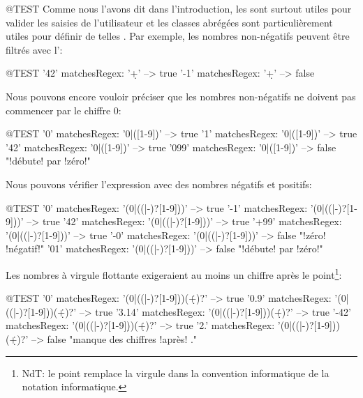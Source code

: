 \documentclass[a4paper,10pt,twoside]{book}
\begin{document}
\begin{code}{@TEST}
Comme nous l'avons dit dans l'introduction, les \expregs sont surtout
utiles pour valider les saisies de l'utilisateur et les classes
abrégées sont particulièrement utiles pour définir de telles \expregs.
Par exemple, les nombres non-négatifs peuvent être filtrés avec
l'\expreg \ct{\d+}:

\begin{code}{@TEST}
'42' matchesRegex: '\d+' --> true
'-1' matchesRegex: '\d+' --> false
\end{code}

Nous pouvons encore vouloir préciser que les nombres non-négatifs ne
doivent pas commencer par le chiffre 0:

\begin{code}{@TEST}
'0' matchesRegex: '0|([1-9]\d*)'     --> true
'1' matchesRegex: '0|([1-9]\d*)'     --> true
'42' matchesRegex: '0|([1-9]\d*)'   --> true
'099' matchesRegex: '0|([1-9]\d*)' --> false    "!débute! par !zéro!"
\end{code}

\noindent{} Nous pouvons vérifier l'expression avec des nombres négatifs et positifs:

\begin{code}{@TEST}
'0' matchesRegex: '(0|((\+|-)?[1-9]\d*))'     --> true
'-1' matchesRegex: '(0|((\+|-)?[1-9]\d*))'   --> true
'42' matchesRegex: '(0|((\+|-)?[1-9]\d*))'   --> true
'+99' matchesRegex: '(0|((\+|-)?[1-9]\d*))' --> true
'-0' matchesRegex: '(0|((\+|-)?[1-9]\d*))'   --> false    "!zéro! !négatif!"
'01' matchesRegex: '(0|((\+|-)?[1-9]\d*))'   --> false    "!débute! par !zéro!"
\end{code}

Les nombres à virgule flottante exigeraient au moins un chiffre après
le point\footnote{NdT: le point remplace la virgule dans la convention
  informatique de la notation informatique.}: 

\begin{code}{@TEST}
'0' matchesRegex: '(0|((\+|-)?[1-9]\d*))(\.\d+)?'      --> true
'0.9' matchesRegex: '(0|((\+|-)?[1-9]\d*))(\.\d+)?'   --> true
'3.14' matchesRegex: '(0|((\+|-)?[1-9]\d*))(\.\d+)?' --> true
'-42' matchesRegex: '(0|((\+|-)?[1-9]\d*))(\.\d+)?'  --> true
'2.' matchesRegex: '(0|((\+|-)?[1-9]\d*))(\.\d+)?'     --> false "manque des chiffres !après! ."
\end{code}


\end{code}
\end{document}
